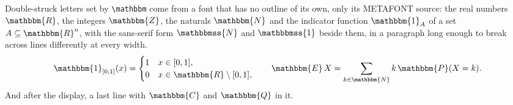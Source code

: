 \documentclass{article}
\begin{document}
Double-struck letters set by \verb|\mathbbm| come from a font that has no
outline of its own, only its METAFONT source: the real numbers
$\mathbbm{R}$, the integers $\mathbbm{Z}$, the naturals $\mathbbm{N}$ and the
indicator function $\mathbbm{1}_A$ of a set $A \subseteq \mathbbm{R}^n$, with
the sans-serif form $\mathbbmss{N}$ and $\mathbbmss{1}$ beside them, in a
paragraph long enough to break across lines differently at every width.
\[
  \mathbbm{1}_{[0,1]}(x) = \begin{cases} 1 & x \in [0,1], \\ 0 & x \in \mathbbm{R} \setminus [0,1], \end{cases}
  \qquad \mathbbm{E}\,X = \sum_{k \in \mathbbm{N}} k\, \mathbbm{P}(X = k).
\]
And after the display, a last line with $\mathbbm{C}$ and $\mathbbm{Q}$ in it.
\end{document}
